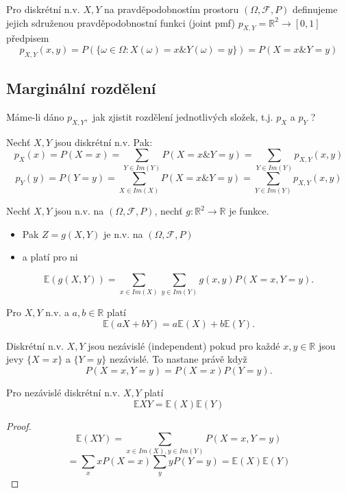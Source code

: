 \documentclass[../main.tex]{subfiles}
\begin{document}
\begin{definition}
    Pro diskrétní n.v. $X,Y$ na pravděpodobnostím prostoru $(\Omega, \mathcal{F},P)$ definujeme jejich sdruženou pravděpodobnostní funkci
    (joint pmf) $p_{X,Y} = \mathbb{R}^2 \rightarrow [0,1]$ předpisem
    \[p_{X,Y} (x,y) = P(\{\omega \in \Omega : X(\omega) = x \& Y(\omega) = y\}) = P(X = x \& Y = y)\]
\end{definition}

\subsection{Marginální rozdělení}

Máme-li dáno $p_{X,Y},$ jak zjistit rozdělení jednotlivých složek, t.j. $p_X$ a $p_Y$ ?

\begin{theorem}
    Nechť $X,Y$ jsou diskrétní n.v. Pak:
    \[p_X(x) = P(X=x) = \sum_{Y\in Im(Y)} P(X = x \& Y=y) = \sum_{Y\in Im(Y)} p_{X,Y}(x,y)\]
    \[p_Y(y) = P(Y=y) = \sum_{X\in Im(X)} P(X = x \& Y=y) = \sum_{Y\in Im(Y)} p_{X,Y}(x,y)\]
\end{theorem}
\begin{theorem}
    Nechť $X,Y$ jsou n.v. na $(\Omega, \mathcal{F},P)$, nechť $g: \mathbb{R}^2 \rightarrow \mathbb{R}$ je funkce.
    \begin{itemize}
        \item Pak $Z = g(X,Y)$ je n.v. na $(\Omega, \mathcal{F},P)$
        \item a platí pro ni 
    \end{itemize}
    \[\mathbb{E}(g(X,Y)) = \sum_{x\in Im(X)} \sum_{y\in Im(Y)} g(x,y)P(X=x,Y=y).\]
\end{theorem}
\begin{theorem}
    Pro $X,Y$ n.v. a $a,b \in \mathbb{R}$ platí
    \[\mathbb{E}(aX + bY) = a\mathbb{E}(X) + b\mathbb{E}(Y).\]
\end{theorem}
\begin{definition}
    Diskrétní n.v. $X,Y$ jsou nezávislé (independent) pokud pro každé $x,y \in \mathbb{R}$ jsou jevy 
    $\{X=x\}$ a $\{Y=y\}$ nezávislé. To nastane právě když
    \[P(X=x,Y=y) = P(X=x)P(Y=y).\]
\end{definition}

\begin{theorem}
    Pro nezávislé diskrétní n.v. $X,Y$ platí
    \[\mathbb{E}XY = \mathbb{E}(X)\mathbb{E}(Y)\]
\end{theorem}
\begin{proof}
    \[\mathbb{E}(XY) = \sum_{x\in Im(X), y \in Im(Y)} P(X=x, Y=y)\]
    \[= \sum_x x P(X=x) \sum_y yP(Y=y) = \mathbb{E}(X)\mathbb{E}(Y)\]
\end{proof}
\end{document}

